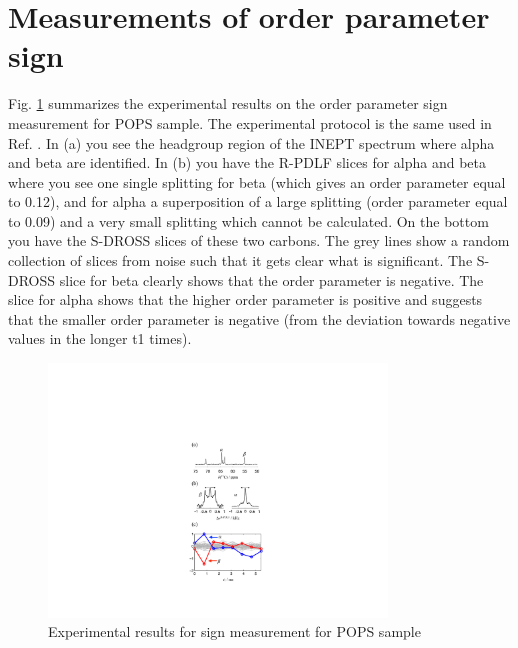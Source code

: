 \documentclass[aps,prl,superscriptaddress,twocolumn]{revtex4}
\begin{document}
\section{Measurements of order parameter sign}

Fig. \ref{PShgSIGNS} summarizes the experimental results on the order parameter sign
measurement for POPS sample. The experimental protocol is the same used in Ref. .
In (a) you see the headgroup region of the INEPT spectrum where alpha and beta are
identified. In (b) you have the R-PDLF slices for alpha and beta where you see one single
splitting for beta (which gives an order parameter equal to 0.12), and for alpha a superposition
of a large splitting (order parameter equal to 0.09) and a very small splitting which cannot be
calculated. On the bottom you have the S-DROSS slices of these two carbons. The grey lines show a
random collection of slices from noise such that it gets clear what is significant. The S-DROSS
slice for beta clearly shows that the order parameter is negative. The slice for alpha shows that
the higher order parameter is positive and suggests that the smaller order parameter is negative
(from the deviation towards negative values in the longer t1 times).
\begin{figure}[]
  \centering
  \includegraphics[width=9.0cm]{../Figs/PShgSIGNS.pdf}
  \caption{\label{PShgSIGNS}
    Experimental results for sign measurement for POPS sample
  }
\end{figure}
\end{document}
